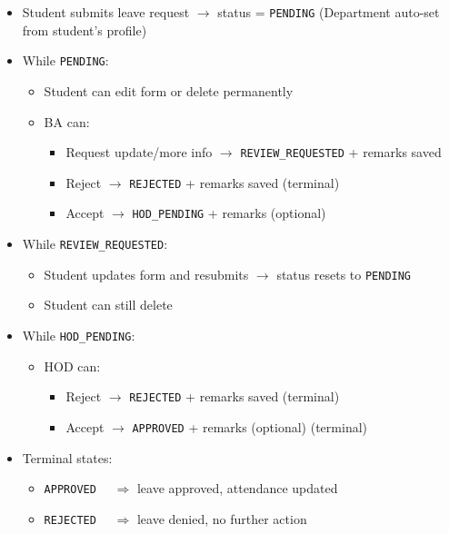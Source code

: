 \begin{itemize}
  \item Student submits leave request
    $\rightarrow$ status = \texttt{PENDING} (Department auto-set from student's profile)

  \item While \texttt{PENDING}:
    \begin{itemize}
      \item Student can edit form or delete permanently
      \item BA can:
        \begin{itemize}
          \item Request update/more info $\rightarrow$ \texttt{REVIEW\_REQUESTED}
                + remarks saved
          \item Reject $\rightarrow$ \texttt{REJECTED}
                + remarks saved (terminal)
          \item Accept $\rightarrow$ \texttt{HOD\_PENDING}
                + remarks (optional)
        \end{itemize}
    \end{itemize}

  \item While \texttt{REVIEW\_REQUESTED}:
    \begin{itemize}
      \item Student updates form and resubmits
        $\rightarrow$ status resets to \texttt{PENDING}
      \item Student can still delete
    \end{itemize}

  \item While \texttt{HOD\_PENDING}:
    \begin{itemize}
      \item HOD can:
        \begin{itemize}
          \item Reject $\rightarrow$ \texttt{REJECTED}
                + remarks saved (terminal)
          \item Accept $\rightarrow$ \texttt{APPROVED}
                + remarks (optional) (terminal)
        \end{itemize}
    \end{itemize}


  \item Terminal states:
    \begin{itemize}
      \item \texttt{APPROVED} $\quad\Rightarrow$ leave approved, attendance updated
      \item \texttt{REJECTED} $\quad\Rightarrow$ leave denied, no further action
    \end{itemize}
\end{itemize}


